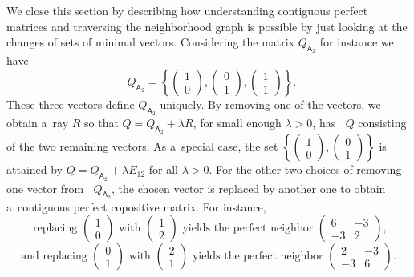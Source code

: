 \documentclass{commat}
\newcommand{\cop}{{\mathcal{COP}}}
\DeclareMathOperator{\MinC}{Min_{\cop}}
\begin{document}
We close this section by describing how understanding contiguous perfect matrices and traversing
the neighborhood graph is possible by just looking at the changes of sets of minimal vectors.
Considering the matrix \(Q_{\mathsf{A}_2} \) for instance we have
\[
    \MinC Q_{\mathsf{A}_2} =
    \left\{
    \begin{pmatrix}
1 \\ 0
\end{pmatrix}
,
    \begin{pmatrix}
0 \\ 1
\end{pmatrix}
,
    \begin{pmatrix}
1 \\ 1
\end{pmatrix}
    \right\}.
\]
These three vectors define \(Q_{\mathsf{A}_2} \) uniquely.
By removing one of the vectors, we obtain a~ray $R$ so that
\(Q=Q_{\mathsf{A}_2}+\lambda R \), for small enough \(\lambda>0 \),
has \(\MinC Q \) consisting of the two remaining vectors.
As a~special case, the set
\(\left\{
\begin{pmatrix}
1 \\ 0
\end{pmatrix}
,
\begin{pmatrix}
0 \\ 1
\end{pmatrix}
\right\} \)
is attained by \(Q=Q_{\mathsf{A}_2}+\lambda E_{12} \) for all \(\lambda>0 \).
For the other two choices of removing one vector from \(\MinC Q_{\mathsf{A}_2} \),
the chosen vector is replaced by another one to obtain a~contiguous perfect copositive matrix.
For instance,
\[
    \text{ replacing }
\begin{pmatrix}
1 \\ 0
\end{pmatrix}
\text{ with }
    \begin{pmatrix}
1 \\ 2
\end{pmatrix}
    \text{ yields the perfect neighbor }
    \begin{pmatrix}
        6 & -3\\
        -3 & 2
    \end{pmatrix}
,
\]
\[
    \text{and replacing }
    \begin{pmatrix}
0 \\ 1
\end{pmatrix}
\text{ with }
    \begin{pmatrix}
2 \\ 1
\end{pmatrix}
    \text{ yields the perfect neighbor }
    \begin{pmatrix}
        2 & -3\\
        -3 & 6
    \end{pmatrix}
.
\]
\end{document}
